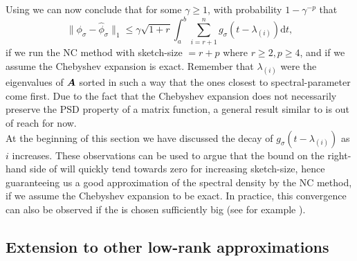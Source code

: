 Using  we can now conclude that for some $\gamma \geq 1$, with probability $1-\gamma^{-p}$ that
\begin{equation}
    \lVert \phi_{\sigma} - \widehat{\phi}_{\sigma} \rVert _1 \leq \gamma\sqrt{1+r} \int_{a}^{b} \sum_{i=r+1}^{n} g_{\sigma}(t - \lambda_{(i)}) \mathrm{d}t,
    \label{equ:3-nystrom-spectral-density-error}
\end{equation}
if we run the \gls{NC} method with \gls{sketch-size} $= r + p$ where $r \geq 2, p \geq 4$,
and if we assume the Chebyshev expansion is exact. Remember that $\lambda_{(i)}$
were the eigenvalues of $\boldsymbol{A}$ sorted in such a way that the ones closest to
\gls{spectral-parameter} come first. Due to the fact that the Chebyshev
expansion does not necessarily preserve the \gls{PSD} property of a matrix function,
a general result similar to  is out of reach for now.\\

At the beginning of this section we have discussed the decay of $g_{\sigma}(t - \lambda_{(i)})$
as $i$ increases. These observations can be used to argue that the bound
on the right-hand side of 
will quickly tend towards zero for increasing \gls{sketch-size}, hence guaranteeing us a good approximation of
the spectral density by the \gls{NC} method, if we assume the Chebyshev expansion
to be exact. In practice, this convergence can also be observed if
the  is chosen sufficiently big
(see for example ).


\subsection{Extension to other low-rank approximations}
\label{subsec:3-nystrom-other-low-rank}

